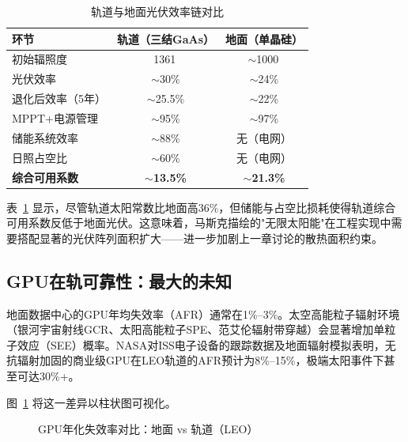\begin{table}[H]
\centering
\footnotesize
\caption{轨道与地面光伏效率链对比}
\label{tab:pv_chain}
\begin{tabular}{lcc}
\toprule
\textbf{环节} & \textbf{轨道（三结GaAs）} & \textbf{地面（单晶硅）} \\
\midrule
初始辐照度                    & 1361\,\unitWpm{}         & $\sim$1000\,\unitWpm{} \\
光伏效率                      & $\sim$30\%               & $\sim$24\%              \\
退化后效率（5年）             & $\sim$25.5\%             & $\sim$22\%              \\
MPPT+电源管理                & $\sim$95\%               & $\sim$97\%              \\
储能系统效率                  & $\sim$88\%               & 无（电网）              \\
日照占空比                    & $\sim$60\%               & 无（电网）              \\
\addlinespace
\textbf{综合可用系数}               & $\sim$\textbf{13.5\%}          & $\sim$\textbf{21.3\%}         \\
\bottomrule
\end{tabular}
\end{table}

表~\ref{tab:pv_chain} 显示，尽管轨道太阳常数比地面高36\%，但储能与占空比损耗使得轨道综合可用系数反低于地面光伏。这意味着，马斯克描绘的"无限太阳能"在工程实现中需要搭配显著的光伏阵列面积扩大——进一步加剧上一章讨论的散热面积约束。

\subsection{GPU在轨可靠性：最大的未知}

地面数据中心的GPU年均失效率（AFR）通常在1\%--3\%\cite{uptime2024}。太空高能粒子辐射环境（银河宇宙射线GCR、太阳高能粒子SPE、范艾伦辐射带穿越）会显著增加单粒子效应（SEE）概率\cite{nasa2021tm4527}。NASA对ISS电子设备的跟踪数据\cite{nasa2024iss}及地面辐射模拟\cite{nasajpl2025rad}表明，无抗辐射加固的商业级GPU在LEO轨道的AFR预计为8\%--15\%，极端太阳事件下甚至可达30\%+。

图~\ref{fig:gpu_afr} 将这一差异以柱状图可视化。

\begin{figure}[H]
\centering

\caption{GPU年化失效率对比：地面 vs 轨道（LEO）}
\label{fig:gpu_afr}
\end{figure}

